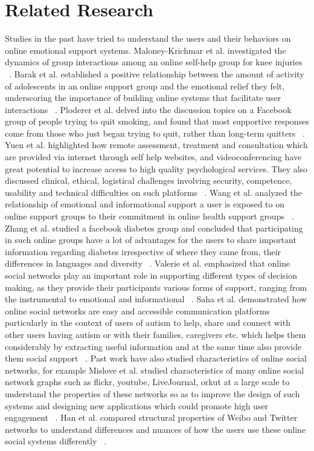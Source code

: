 \chapter{Related Research}

Studies in the past have tried to understand the users and their behaviors on online emotional support systems. Maloney-Krichmar et al. investigated the dynamics of group interactions among an online self-help group for knee injuries ~\cite {maloney2005multilevel}. Barak et al. established a positive relationship between the amount of activity of adolescents in an online support group and the emotional relief they felt, underscoring the importance of building online systems that facilitate user interactions ~\cite {barak2007emotional}. Ploderer et al. delved into the discussion topics on a Facebook group of people trying to quit smoking, and found that most supportive responses come from those who just began trying to quit, rather than long-term quitters ~\cite {ploderer2013patterns}. Yuen et al. highlighted how remote assessment, treatment and consultation which are provided via internet through self help websites, and videoconferencing have great potential to increase access to high quality psychological services. They also discussed clinical, ethical, logistical challenges involving security, competence, usability and technical difficulties on such platforms ~\cite {yuen2012challenges}. Wang et al. analyzed the relationship of emotional and informational support a user is exposed to on online support groups to their commitment in online health support groups ~\cite{wang2012stay}. Zhang et al. studied a facebook diabetes group and concluded that participating in such online groups have a lot of advantages for the users to share important information regarding diabetes irrespective of where they came from, their differences in languages and diversity ~\cite{zhang2013facebook}. Valerie et al. emphasized that online social networks play an important role in supporting different types of decision making, as they provide their participants various forms of support, ranging from the instrumental to emotional and informational ~\cite{sadovykh2015decision}. Saha et al. demonstrated how online social networks are easy and accessible communication platforms particularly in the context of users of autism to help, share and connect with other users having autism or with their families, caregivers etc. which helps them considerably by extracting useful information and at the same time also provide them social support ~\cite{saha2015demonstrating}. Past work have also studied characteristics of online social networks, for example Mislove et al. studied characteristics of many online social network graphs such as flickr, youtube, LiveJournal, orkut at a large scale to understand the properties of these networks so as to improve the design of such systems and designing new applications which could promote high user engagement ~\cite{mislove2007measurement}. Han et al. compared structural properties of Weibo and Twitter networks to understand differences and nuances of how the users use these online social systems differently ~\cite{han2015weibo}. 

